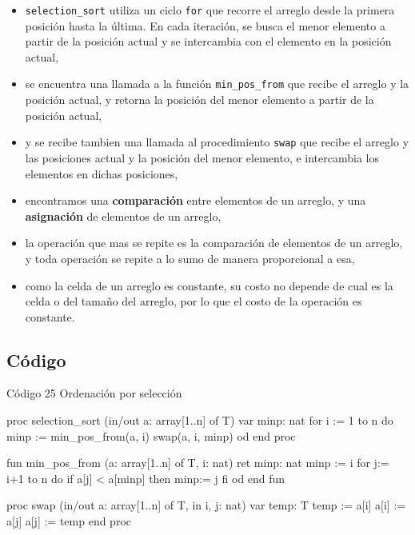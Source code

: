 \begin{itemize}
    \item \texttt{selection\_sort} utiliza un ciclo \texttt{for} que recorre el arreglo desde la primera posición hasta la última. En cada iteración, se busca el menor elemento a partir de la posición actual y se intercambia con el elemento en la posición actual,
    \item se encuentra una llamada a la función \texttt{min\_pos\_from} que recibe el arreglo y la posición actual, y retorna la posición del menor elemento a partir de la posición actual,
    \item y se recibe tambien una llamada al procedimiento \texttt{swap} que recibe el arreglo y las posiciones actual y la posición del menor elemento, e intercambia los elementos en dichas posiciones,
    \item encontramos una \textbf{comparación} entre elementos de un arreglo, y una \textbf{asignación} de elementos de un arreglo,
    \item la operación que mas se repite es la comparación de elementos de un arreglo, y toda operación se repite a lo sumo de manera proporcional a esa,
    \item como la celda de un arreglo es constante, su costo no depende de cual es la celda o del tamaño del arreglo, por lo que el costo de la operación es constante.
\end{itemize}

\subsection{Código}

\begin{codebox}{Código 25}
\footnotesize Ordenación por selección
\tcblower
\begin{pascallike}
proc selection_sort (in/out a: array[1..n] of T)
    var minp: nat
    for i := 1 to n do
        minp := min_pos_from(a, i)
        swap(a, i, minp) 
    od
end proc

fun min_pos_from (a: array[1..n] of T, i: nat) ret minp: nat
    minp := i
    for j:= i+1 to n do 
        if a[j] < a[minp] then 
            minp:= j 
        fi
    od
end fun

proc swap (in/out a: array[1..n] of T, in i, j: nat)
    var temp: T
    temp := a[i]
    a[i] := a[j]
    a[j] := temp
end proc
\end{pascallike}
\end{codebox}

